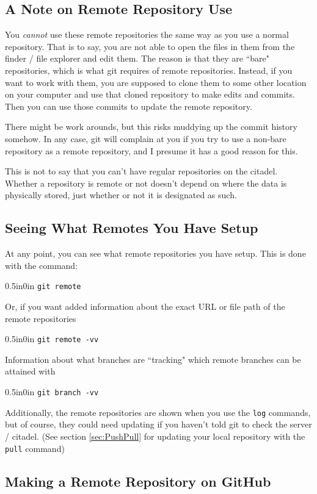 \documentclass[11pt]{article}
\newcommand{\code}[1]{\begin{adjustwidth}{0.5in}{0in}
    \texttt{#1}
    \end{adjustwidth}}
\begin{document}
\subsection{A Note on Remote Repository Use}
You \emph{cannot} use these remote repositories the same way as you use a normal repository.  That is to say, you are not able to open the files in them from the finder / file explorer and edit them.  The reason is that they are ``bare" repositories, which is what git requires of remote repositories.  Instead, if you want to work with them, you are supposed to clone them to some other location on your computer and use that cloned repository to make edits and commits.  Then you can use those commits to update the remote repository.  

There might be work arounds, but this risks muddying up the commit history somehow.  In any case, git will complain at you if you try to use a non-bare repository as a remote repository, and I presume it has a good reason for this.  

This is not to say that you can't have regular repositories on the citadel.  Whether a repository is remote or not doesn't depend on where the data is physically stored, just whether or not it is designated as such.

\subsection{Seeing What Remotes You Have Setup}

At any point, you can see what remote repositories you have setup.  This is done with the command:

\code{git remote}

Or, if you want added information about the exact URL or file path of the remote repositories

\code{git remote -vv}

Information about what branches are ``tracking" which remote branches can be attained with 

\code{git branch -vv}

Additionally, the remote repositories are shown when you use the \texttt{log} commands, but of course, they could need updating if you haven't told git to check the server / citadel.  (See section \ref{sec:PushPull} for updating your local repository with the \texttt{pull} command)

\subsection{Making a Remote Repository on GitHub}
\end{document}
